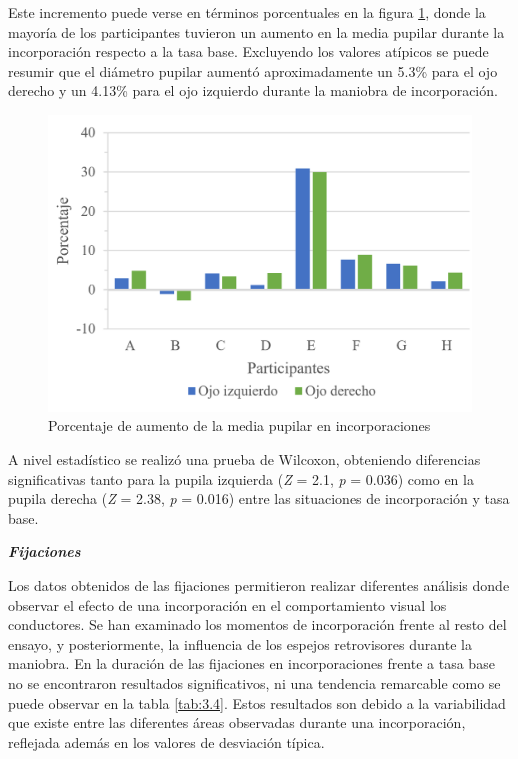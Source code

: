 Este incremento puede verse en términos porcentuales en la figura \ref{fig:3.3}, donde la mayoría de los participantes tuvieron un aumento en la media pupilar durante la incorporación respecto a la tasa base. Excluyendo los valores atípicos se puede resumir que el diámetro pupilar aumentó aproximadamente un 5.3\% para el ojo derecho y un 4.13\% para el ojo izquierdo durante la maniobra de incorporación.

\begin{figure}[h]
    \centering
    \includegraphics[width=12cm]
    {figures/3.3.png}
    \caption{ \label{fig:3.3} Porcentaje de aumento de la media pupilar en incorporaciones}
\end{figure}

A nivel estadístico se realizó una prueba de Wilcoxon, obteniendo diferencias significativas tanto para la pupila izquierda (\emph{Z} = 2.1, \emph{p} = 0.036) como en la pupila derecha (\emph{Z} = 2.38, \emph{p} = 0.016) entre las situaciones de incorporación y tasa base. 

\textbf{\emph{Fijaciones}}

Los datos obtenidos de las fijaciones permitieron realizar diferentes análisis donde observar el efecto de una incorporación en el comportamiento visual los conductores. Se han examinado los momentos de incorporación frente al resto del ensayo, y posteriormente, la influencia de los espejos retrovisores durante la maniobra.
En la duración de las fijaciones en incorporaciones frente a tasa base no se encontraron resultados significativos, ni una tendencia remarcable como se puede observar en la tabla \ref{tab:3.4}. Estos resultados son debido a la variabilidad que existe entre las diferentes áreas observadas durante una incorporación, reflejada además en los valores de desviación típica.

